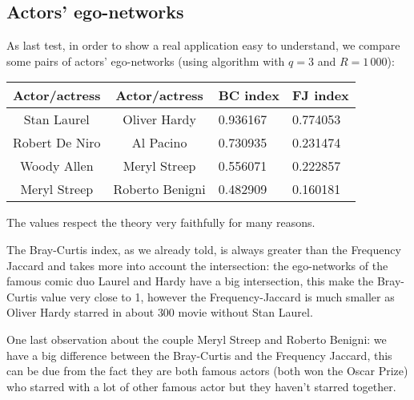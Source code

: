 	\subsection*{Actors' ego-networks}
	
	As last test, in order to show a real application easy to understand, we compare
	some pairs of actors' ego-networks (using \fcount algorithm with $q=3$ and $R=1\,000$):
	
	\begin{table}[h]
		\centering
		\begin{tabular}{c|c|l|l}
			Actor/actress & Actor/actress & BC index & FJ index\\ 
			\hline
			Stan Laurel & Oliver Hardy & 0.936167 & 0.774053 \\
			Robert De Niro & Al Pacino & 0.730935 & 0.231474\\
			Woody Allen & Meryl Streep & 0.556071 & 0.222857\\
			Meryl Streep & Roberto Benigni & 0.482909 & 0.160181\\
		\end{tabular}
	\end{table}

	The values respect the theory very faithfully for many reasons.
	
	The Bray-Curtis index, as we already told, is always greater than the Frequency Jaccard and takes more into account the intersection:
	the ego-networks of the famous comic duo Laurel and Hardy have a big intersection, this make the Bray-Curtis value very close to 1, however the Frequency-Jaccard is much smaller as Oliver Hardy starred in about $300$ movie without Stan Laurel.
	
	One last observation about the couple Meryl Streep and Roberto Benigni: we have a big difference between the Bray-Curtis and the Frequency Jaccard, this can be due from the fact they are both famous actors (both won the Oscar Prize) who starred with a lot of other famous actor but they haven't starred together.
	
